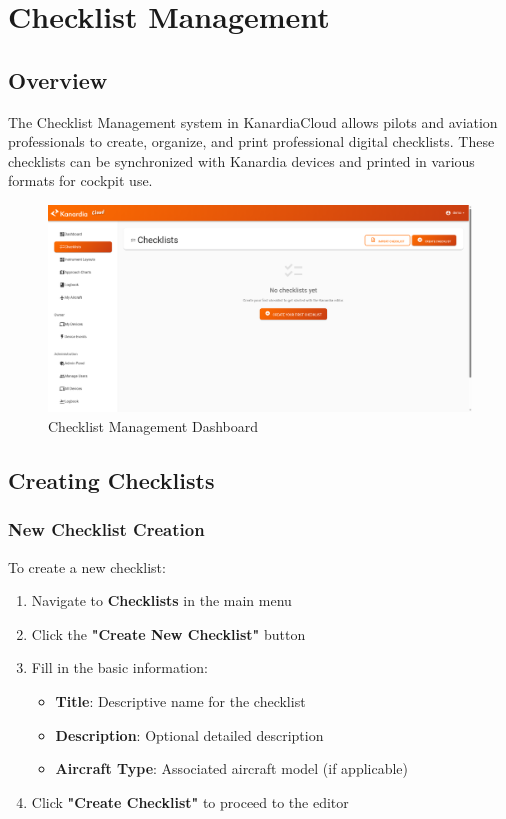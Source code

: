 \chapter{Checklist Management}

\section{Overview}

The Checklist Management system in KanardiaCloud allows pilots and aviation professionals to create, organize, and print professional digital checklists. These checklists can be synchronized with Kanardia devices and printed in various formats for cockpit use.

\begin{figure}[H]
\centering
\includegraphics[width=\textwidth]{images/checklist_dashboard.png}
\caption{Checklist Management Dashboard}
\label{fig:checklist_dashboard}
\end{figure}

\section{Creating Checklists}

\subsection{New Checklist Creation}

To create a new checklist:

\begin{enumerate}
    \item Navigate to \textbf{Checklists} in the main menu
    \item Click the \textbf{"Create New Checklist"} button
    \item Fill in the basic information:
    \begin{itemize}
        \item \textbf{Title}: Descriptive name for the checklist
        \item \textbf{Description}: Optional detailed description
        \item \textbf{Aircraft Type}: Associated aircraft model (if applicable)
    \end{itemize}
    \item Click \textbf{"Create Checklist"} to proceed to the editor
\end{enumerate}

